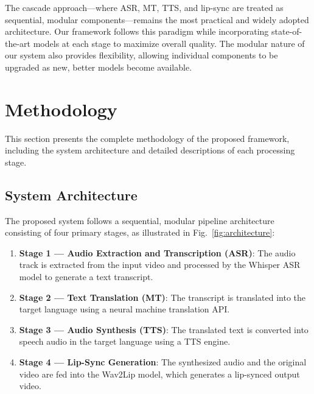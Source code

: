 \documentclass[conference]{IEEEtran}
\begin{document}
The cascade approach---where ASR, MT, TTS, and lip-sync are treated as sequential, modular components---remains the most practical and widely adopted architecture. Our framework follows this paradigm while incorporating state-of-the-art models at each stage to maximize overall quality. The modular nature of our system also provides flexibility, allowing individual components to be upgraded as new, better models become available.

\section{Methodology}

This section presents the complete methodology of the proposed framework, including the system architecture and detailed descriptions of each processing stage.

\subsection{System Architecture}

The proposed system follows a sequential, modular pipeline architecture consisting of four primary stages, as illustrated in Fig.~\ref{fig:architecture}:

\begin{enumerate}
    \item \textbf{Stage 1 --- Audio Extraction and Transcription (ASR)}: The audio track is extracted from the input video and processed by the Whisper ASR model to generate a text transcript.
    \item \textbf{Stage 2 --- Text Translation (MT)}: The transcript is translated into the target language using a neural machine translation API.
    \item \textbf{Stage 3 --- Audio Synthesis (TTS)}: The translated text is converted into speech audio in the target language using a TTS engine.
    \item \textbf{Stage 4 --- Lip-Sync Generation}: The synthesized audio and the original video are fed into the Wav2Lip model, which generates a lip-synced output video.
\end{enumerate}
\end{document}
